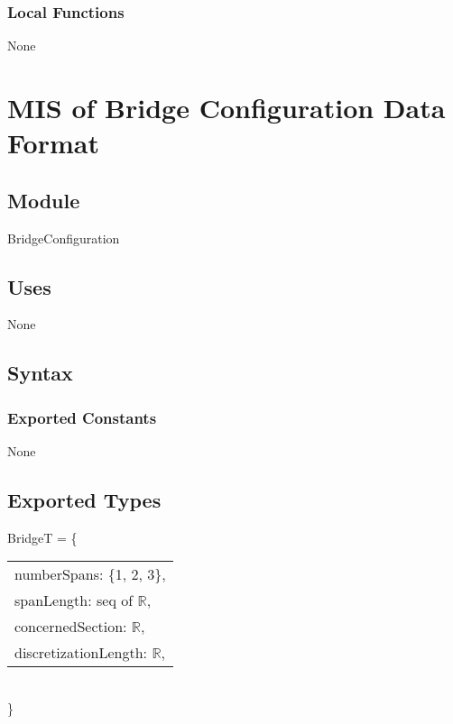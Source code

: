 \documentclass[12pt, titlepage]{article}
\begin{document}
\subsubsection{Local Functions}
None
\newpage

\section{MIS of Bridge Configuration Data Format} \label{BridgeConfiguration} 

\subsection{Module}

BridgeConfiguration

\subsection{Uses}
None

\subsection{Syntax}

\subsubsection{Exported Constants}
None
\subsection{Exported Types}
BridgeT = \{\\
    \begin{tabular}{l}
	numberSpans: \{1, 2, 3\},\\
	spanLength: seq of $\mathbb{R}$,\\
	concernedSection: $\mathbb{R}$,\\
    discretizationLength: $\mathbb{R}$,\\
    \end{tabular}
\\\}
\end{document}
